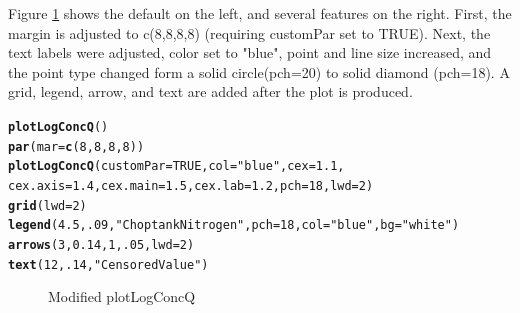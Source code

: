 \documentclass[a4paper,11pt]{article}\usepackage{graphicx, color}
\makeatletter
\newcommand{\hlfunctioncall}[1]{\textcolor[rgb]{0.501960784313725,0,0.329411764705882}{\textbf{#1}}}%
\newcommand{\hlstring}[1]{\textcolor[rgb]{0.6,0.6,1}{#1}}%
\newenvironment{kframe}{%
 \def\at@end@of@kframe{}%
 \ifinner\ifhmode%
  \def\at@end@of@kframe{\end{minipage}}%
  \begin{minipage}{\columnwidth}%
 \fi\fi%
 \def\FrameCommand##1{\hskip\@totalleftmargin \hskip-\fboxsep
 \colorbox{shadecolor}{##1}\hskip-\fboxsep
     \hskip-\linewidth \hskip-\@totalleftmargin \hskip\columnwidth}%
 \MakeFramed {\advance\hsize-\width
   \@totalleftmargin\z@ \linewidth\hsize
   \@setminipage}}%
 {\par\unskip\endMakeFramed%
 \at@end@of@kframe}
\newenvironment{knitrout}{}{} %
\makeatother
\begin{document}
Figure \ref{fig:plotLogConcQComparison} shows the default on the left, and several features on the right. First, the margin is adjusted to c(8,8,8,8) (requiring customPar set to TRUE). Next, the text labels were adjusted, color set to "blue", point and line size increased, and the point type changed form a solid circle(pch=20) to solid diamond (pch=18). A grid, legend, arrow, and text are added after the plot is produced.
\begin{knitrout}
\color{fgcolor}\begin{kframe}
\begin{alltt}
\hlfunctioncall{plotLogConcQ}()
\hlfunctioncall{par}(mar=\hlfunctioncall{c}(8,8,8,8))
\hlfunctioncall{plotLogConcQ}(customPar=TRUE,col=\hlstring{"blue"},cex=1.1,
             cex.axis=1.4,cex.main=1.5,cex.lab=1.2,pch=18,lwd=2)
\hlfunctioncall{grid}(lwd=2)
\hlfunctioncall{legend}(4.5,.09,\hlstring{"Choptank Nitrogen"}, pch=18, col=\hlstring{"blue"},bg=\hlstring{"white"})
\hlfunctioncall{arrows}(3, 0.14, 1, .05,lwd=2)
\hlfunctioncall{text}(12,.14,\hlstring{"Censored Value"})
\end{alltt}
\end{kframe}\begin{figure}[]
\caption[Modified plotLogConcQ]{Modified plotLogConcQ\label{fig:plotLogConcQComparison}}
\end{figure}


\end{knitrout}
\end{document}
